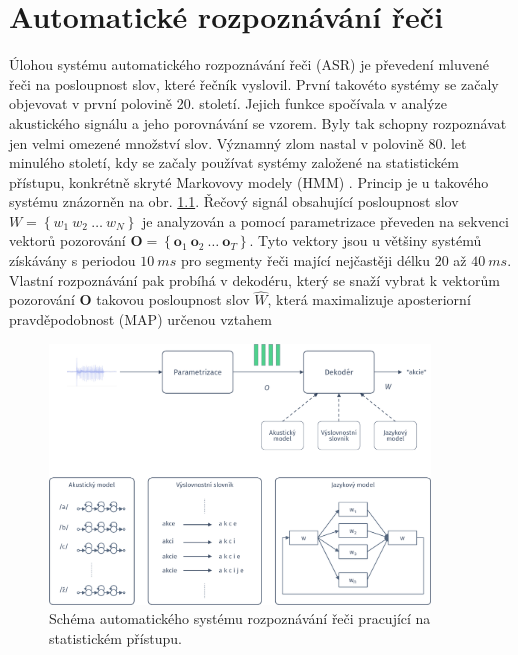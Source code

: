 \chapter{Automatické rozpoznávání řeči}
\label{chap:asr}

Úlohou systému automatického rozpoznávání řeči (ASR) je převedení mluvené řeči na posloupnost slov, které řečník vyslovil. První takovéto systémy se začaly objevovat v první polovině 20. století. Jejich funkce spočívala v analýze akustického signálu a jeho porovnávání se vzorem. Byly tak schopny rozpoznávat jen velmi omezené množství slov. Významný zlom nastal v polovině 80. let minulého století, kdy se začaly používat systémy založené na statistickém přístupu, konkrétně skryté Markovovy modely (HMM) \cite{Holmes2001}. Princip je u takového systému znázorněn na obr. \ref{fig:asr:decoding}. Řečový signál obsahující posloupnost slov $W = \left\{ w_1\ w_2\ \dots\ w_N \right\}$ je analyzován a pomocí parametrizace převeden na sekvenci vektorů pozorování $\boldsymbol{O} = \left\{\boldsymbol{o}_1\ \boldsymbol{o}_2\ \dots\ \boldsymbol{o}_T\right\}$. Tyto vektory jsou u většiny systémů získávány s periodou $10\ ms$ pro segmenty řeči mající nejčastěji délku $20$ až $40\ ms$. Vlastní rozpoznávání pak probíhá v dekodéru, který se snaží vybrat k vektorům pozorování $\boldsymbol{O}$ takovou posloupnost slov $\hat{W}$, která maximalizuje aposteriorní pravděpodobnost (MAP) určenou vztahem

\begin{figure}[hbpt]
  \centering
  \includegraphics[width=0.9\textwidth]{./ch4-asr/img/decoding.pdf}
  \caption[Schéma ASR systému pracující se statistickou.]{Schéma automatického systému rozpoznávání řeči pracující na statistickém přístupu.}
  \label{fig:asr:decoding}
\end{figure}

